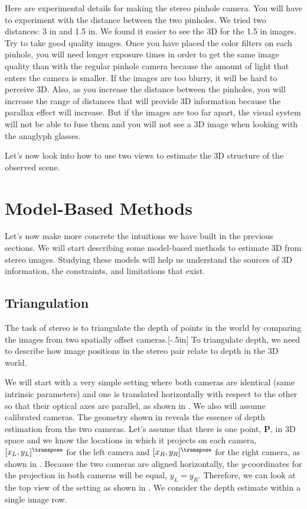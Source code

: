 Here are experimental details for making the stereo pinhole camera. You will have to experiment with the distance between the two pinholes. We tried two distances: 3 in and 1.5 in. We found it easier to see the 3D for the 1.5 in images. Try to take good quality images. Once you have placed the color filters on each pinhole, you will need longer exposure times in order to get the same image quality than with the regular pinhole camera because the amount of light that enters the camera is smaller. If the images are too blurry, it will be hard to perceive 3D. Also, as you increase the distance between the pinholes, you will increase the range of distances that will provide 3D information because the parallax effect will increase. But if the images are too far apart, the visual system will not be able to fuse them and you will not see a 3D image when looking with the anaglyph glasses.

Let's now look into how to use two views to estimate the 3D structure of the observed scene. 

\section{Model-Based Methods}

Let's now make more concrete the intuitions we have built in the previous sections.
We will start describing some model-based methods to estimate 3D from stereo images. Studying these models will help us understand the sources of 3D information, the constraints, and limitations that exist. 

\subsection{Triangulation}

The task of stereo is to triangulate the depth of points in the world by comparing the images from two spatially offset cameras.[-.5in]  To triangulate depth, we need to describe how image positions in the stereo pair relate to depth in the 3D world. 



We will start with a very simple setting where both cameras are identical (same intrinsic parameters) and one is translated horizontally with respect to the other so that their optical axes are parallel, as shown in \fig{\ref{fig:stereo}}. We also will assume calibrated cameras.
The geometry shown in \fig{\ref{fig:stereo}} reveals the essence of depth estimation from the two cameras.   
Let's assume that there is one point, $\mathbf{P}$, in 3D space and we know the locations in which it projects on each camera, $[x_L,y_L]^\transpose$ for the left camera and $[x_R,y_R]^\transpose$ for the right camera, as shown in . Because the two cameras are aligned horizontally, the $y$-coordinates for the projection in both cameras will be equal, $y_L=y_R$. Therefore, we can look at the top view of the setting as shown in . We consider the depth estimate within a single image row. 

